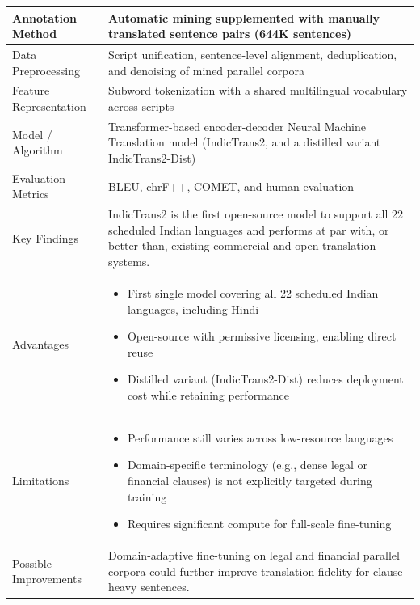\begin{longtable}{|p{5cm}|p{10cm}|}
Annotation Method &
Automatic mining supplemented with manually translated sentence pairs (644K sentences)
\\ \hline

Data Preprocessing &
Script unification, sentence-level alignment, deduplication, and denoising of mined parallel corpora
\\ \hline

Feature Representation &
Subword tokenization with a shared multilingual vocabulary across scripts
\\ \hline

Model / Algorithm &
Transformer-based encoder-decoder Neural Machine Translation model (IndicTrans2, and a distilled variant IndicTrans2-Dist)
\\ \hline

Evaluation Metrics &
BLEU, chrF++, COMET, and human evaluation
\\ \hline

Key Findings &
IndicTrans2 is the first open-source model to support all 22 scheduled Indian languages and performs at par with, or better than, existing commercial and open translation systems.
\\ \hline

Advantages &
\begin{itemize}
\item First single model covering all 22 scheduled Indian languages, including Hindi
\item Open-source with permissive licensing, enabling direct reuse
\item Distilled variant (IndicTrans2-Dist) reduces deployment cost while retaining performance
\end{itemize}
\\ \hline

Limitations &
\begin{itemize}
\item Performance still varies across low-resource languages
\item Domain-specific terminology (e.g., dense legal or financial clauses) is not explicitly targeted during training
\item Requires significant compute for full-scale fine-tuning
\end{itemize}
\\ \hline

Possible Improvements &
Domain-adaptive fine-tuning on legal and financial parallel corpora could further improve translation fidelity for clause-heavy sentences.
\\ \hline

\end{longtable}

